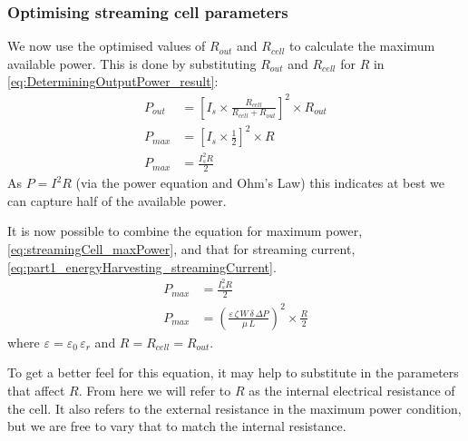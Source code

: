 

    \subsubsection*{Optimising streaming cell parameters}


      We now use the optimised values of $R_{out}$ and $R_{cell}$ to calculate the maximum available power.
      This is done by substituting $R_{out}$ and $R_{cell}$ for $R$ in \cref{eq:DeterminingOutputPower_result}:
      \begin{align}
          P_{out} & = \left[I_{s}\times\frac{R_{cell}}{R_{cell}+R_{out}}\right]^{2}\times R_{out}\nonumber \\
          P_{max} & = \left[I_{s}\times\frac{1}{2}\right]^{2}\times R\nonumber \\
          P_{max} & = \frac{I_{s}^{2}R}{2}
          \label{eq:streamingCell_maxPower}
      \end{align}
      As $P=I^{2}R$ (via the power equation and Ohm's Law) this indicates at best we can capture half of the available power.

      It is now possible to combine the equation for maximum power, \cref{eq:streamingCell_maxPower}, and that for streaming current, \cref{eq:part1_energyHarvesting_streamingCurrent}.
      \begin{align}
          P_{max} & = \frac{I_{s}^{2}R}{2}\nonumber \\
          P_{max} & = \left(\frac{\varepsilon\,\zeta\,W\,\delta\,\Delta P}{\mu\,L}\right)^{2}\times\frac{R}{2}
          \label{eq:streamingCell_maxPower_substituted}
      \end{align}
      where $\varepsilon=\varepsilon_{0}\,\varepsilon_{r}$ and $R=R_{cell}=R_{out}$.

      To get a better feel for this equation, it may help to substitute in the parameters that affect $R$.
      From here we will refer to $R$ as the internal electrical resistance of the cell.
      It also refers to the external resistance in the maximum power condition, but we are free to vary that to match the internal resistance.

